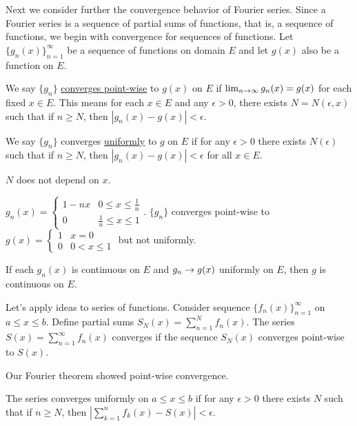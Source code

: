 \documentclass[]{article}
\begin{document}
Next we consider further the convergence behavior of  Fourier series.
Since a Fourier series is a sequence of partial sums of functions, that is, a sequence of functions, we begin with convergence for sequences of functions.
Let $\{g_n(x)\}_{n=1}^\infty$ be a sequence of functions on domain $E$ and let $g(x)$ also be a function on $E$.
\begin{definition}
	We say $\{g_n\}$ \underline{converges point-wise} to $g(x)$ on $E$ if $\lim_{n\rightarrow\infty} g_n(x) = g(x)$ for each fixed $x\in E$.
	This means for each $x\in E$ and any $\epsilon>0$, there exists $N = N(\epsilon,x)$ such that if $n\geq N$, then $|g_n(x) - g(x)|<\epsilon$.
\end{definition}
\begin{definition}
	We say $\{g_n\}$ converges \underline{uniformly} to $g$ on $E$ if for any $\epsilon>0$ there exists $N(\epsilon)$ such that if $n\geq N$, then $|g_n(x)-g(x)|<\epsilon$ for all $x\in E$.
\end{definition}
\begin{note}
	$N$ does not depend on $x$.
\end{note}
\begin{example}
	$g_n(x) = \begin{cases} 1-nx &0\leq x\leq \frac{1}{n} \\ 0 & \frac{1}{n} \leq x \leq 1	\end{cases}$. $\{g_n\}$ converges point-wise to $g(x) = \begin{cases} 1 & x=0 \\ 0 & 0<x\leq1 \end{cases}$ but not uniformly.
\end{example}
\begin{note}
	If each $g_n(x)$ is continuous on $E$ and $g_n \rightarrow g(x)$ uniformly on $E$, then $g$ is continuous on $E$.
\end{note}
Let's apply ideas to series of functions. Consider sequence $\{f_n(x)\}_{n=1}^\infty$ on $a\leq x\leq b$. Define partial sums $S_N(x) = \sum_{n=1}^N f_n(x)$.
The series $S(x) = \sum_{n=1}^\infty f_n(x)$ converges if the sequence $S_N(x)$ converges point-wise to $S(x)$.
\begin{note}
	Our Fourier theorem showed point-wise convergence.
\end{note}
The series converges uniformly on $a\leq x\leq b$ if for any $\epsilon>0$ there exists $N$ such that if $n\geq N$, then $|\sum_{k=1}^n f_k(x) - S(x)|<\epsilon$.
\end{document}
